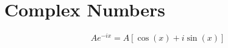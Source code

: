 \section{Complex Numbers} \label{app:Complex Numbers}
	\begin{equation} \label{eq:Exponential to Rectangular}
		A e^{-ix} = A \left[ \cos \left( x \right) + i\sin \left( x \right) \right]
	\end{equation}